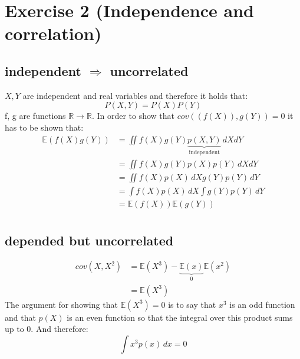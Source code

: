 \documentclass[]{article}
\begin{document}
\section{Exercise 2 (Independence and correlation)} %
\label{sg:sec:ex2}

\subsection{independent $\Rightarrow$ uncorrelated} %
\label{sg:sub:2_1}
$X, Y$ are independent and real variables and therefore it holds that:
\begin{equation}
	P(X,Y) = P(X) P(Y)
\end{equation}
f, g are functions $\mathbb{R} \rightarrow \mathbb{R}$. In order to show
that $cov((f(X)), g(Y)) = 0$ it has to be shown that:
\begin{equation}
	\begin{aligned}
		\mathbb{E}(f(X) g(Y)) 
		&= \iint{f(X) g(Y) \underbrace{p(X,Y)}_\mathrm{independent} \, dX dY}  \\
		&= \iint{f(X) g(Y) p(X) p(Y) \, dX dY} \\
		&= \iint{f(X) p(X) \, dX g(Y) p(Y) \, dY}	\\
		&= \int{f(X) p(X) \, dX} \int{g(Y) p(Y) \, dY}	\\
		&= \mathbb{E}(f(X)) \mathbb{E}(g(Y)) \\
	\end{aligned}
\end{equation}


\subsection{depended but uncorrelated} %
\label{sg:sub:2_2}

\begin{equation}
	\begin{aligned}
		cov(X,X^2) &= \mathbb{E}(X^3) - \underbrace{\mathbb{E}(x)}_0 \mathbb{E}(x^2) \\
		&= \mathbb{E}(X^3)
	\end{aligned}
\end{equation}
The argument for showing that $\mathbb{E}(X^3) = 0$ is to say that $x^3$ is an
odd function and that $p(X)$ is an even function so that the integral over this product 
sums up to 0. And therefore:
\begin{equation}
	\int{x^3 p(x) \, dx} = 0
\end{equation}
\end{document}
